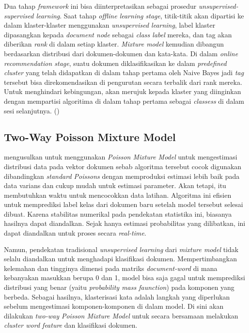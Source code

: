 Dua tahap \textit{framework} ini bisa diinterpretasikan sebagai prosedur \textit{unsupervised-supervised learning}. Saat tahap \textit{offline learning stage}, titik-titik akan dipartisi ke dalam klaster-klaster menggunakan \textit{unsupervised learning}, label klaster dipasangkan kepada \textit{document node} sebagai \textit{class label} mereka, dan tag akan diberikan \textit{rank} di dalam setiap klaster. \textit{Mixture model} kemudian dibangun berdasarkan distribusi dari dokumen-dokumen dan kata-kata. Di dalam \textit{online recommendation stage}, suatu dokumen diklasifikasikan ke dalam \textit{predefined cluster} yang telah didapatkan di dalam tahap pertama oleh Naive Bayes jadi \textit{tag} tersebut bisa direkomendasikan di pengurutan secara terbalik dari rank mereka. Untuk menghindari kebingungan, \cite{song2008autotag} akan merujuk kepada klaster yang diinginkan dengan mempartisi algoritima di dalam tahap pertama sebagai \textit{classess} di dalam sesi selanjutnya. (\cite{song2008autotag})

\subsection{Two-Way Poisson Mixture Model}

\cite{song2008autotag} mengusulkan untuk menggunakan \textit{Poisson Mixture Model} untuk mengestimasi distribusi data pada vektor dokumen sebab algoritma tersebut  cocok digunakan dibandingkan \textit{standard Poissons} dengan memproduksi estimasi lebih baik pada data varians dan cukup mudah untuk estimasi parameter. Akan tetapi, itu membutuhkan waktu untuk mencocokkan data latihan. Algoritma ini efisien untuk memprediksi label kelas dari dokumen baru setelah model tersebut selesai dibuat. Karena stabilitas numerikal pada pendekatan statistika ini, biasanya hasilnya dapat diandalkan. Sejak hanya estimasi probabilitas yang dilibatkan, ini dapat diandalkan untuk proses secara \textit{real-time}.

Namun, pendekatan tradisional \textit{unsupervised learning} dari \textit{mixture model} tidak selalu diandalkan untuk menghadapi klasifikasi dokumen. Mempertimbangkan kelemahan dan tingginya dimensi pada matriks \textit{document-word} di mana kebanyakan masukkan berupa 0 dan 1, model bisa saja gagal untuk memprediksi distribusi yang benar (yaitu \textit{probability mass faunction}) pada komponen yang berbeda. Sebagai hasilnya, klasterisasi kata adalah langkah yang diperlukan sebelum mengestimasi komponen-komponen di dalam model. Di sini akan dilakukan \textit{two-way Poisson Mixture Model} untuk secara bersamaan melakukan \textit{cluster word feature} dan klasifikasi dokumen.

